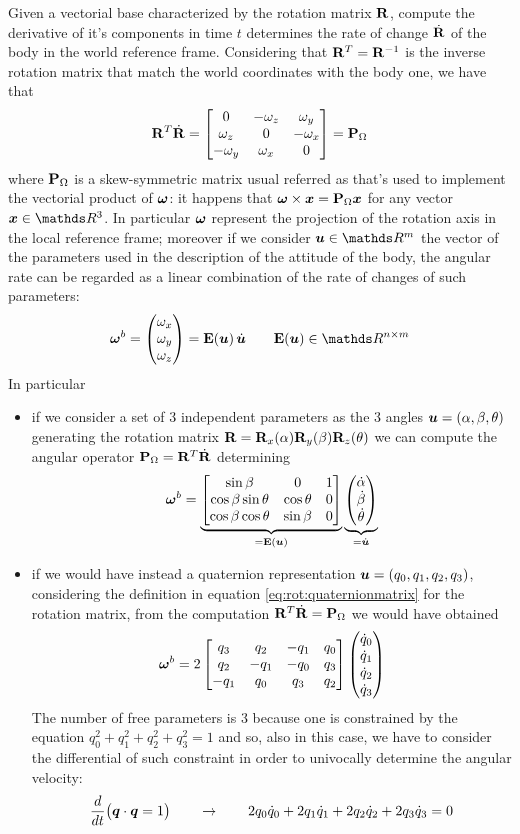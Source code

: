 		Given a vectorial base characterized by the rotation matrix $\mathbf{R}$, compute the derivative of it's components in time $t$ determines the rate of change $\dot {\mathbf{R}}$ of the body in the world reference frame. Considering that $\mathbf{R}^T = \mathbf{R}^{-1}$ is  the inverse rotation matrix that match the world coordinates with the body one, we have that
		\begin{equation}
			\mathbf{R}^T \dot {\mathbf{R}} = \begin{bmatrix} 0 & - \omega_z & \omega_y \\ \omega_z & 0 & - \omega_x \\ -\omega_y & \omega_x & 0 \end{bmatrix} = \mathbf{P}_\Omega
		\end{equation}
		where $\mathbf{P}_\Omega$ is a skew-symmetric matrix usual referred as  that's used to implement the vectorial product of $\boldsymbol{\omega}$: it happens that $\boldsymbol{\omega} \times \boldsymbol{x} = \mathbf{P}_\Omega \boldsymbol{x}$ for any vector $\vett x \in \mathds R^3$. In particular $\boldsymbol{\omega}$ represent the projection of the rotation axis in the local reference frame; moreover if we consider $\vett u \in \mathds R^m$ the vector of the parameters used in the description of the attitude of the body, the angular rate can be regarded as a linear combination of the rate of changes of such parameters:
		\[ \vett \omega^b = \vector{\omega_x \\ \omega_y \\ \omega_z} = \mat E(\vett u) \, \dvett u \qquad \mat E(\vett u) \in \mathds R^{n\times m}\]
		In particular
		\begin{itemize}
			\item if we consider a set of 3 independent parameters as the 3 angles $\boldsymbol{u} = (\alpha,\beta,\theta)$ generating the rotation matrix $\mathbf{R}= \mathbf{R}_x(\alpha) \mathbf{R}_y(\beta) \mathbf{R}_z(\theta)$ we can compute the angular operator $\mathbf{P}_\Omega = \mathbf{R}^T \dot{\mathbf{R}}$ determining 
			\[ \boldsymbol{\omega}^b = \underbrace{ \begin{bmatrix}  \sin \beta & 0 & 1 \\ \cos\beta\sin\theta & \cos\theta & 0 \\ \cos\beta \cos\theta & \sin\beta & 0  \end{bmatrix}}_{=\mathbf{E}(\boldsymbol{u})} \underbrace{\begin{pmatrix} \dot \alpha \\ \dot \beta \\ \dot \theta \end{pmatrix}}_{=\dot{\boldsymbol{u}}} \]
			\item if we would have instead a quaternion representation $\boldsymbol{u} = (q_0,q_1,q_2,q_3)$, considering the definition in equation \ref{eq:rot:quaternionmatrix} for the rotation matrix, from the computation $\mathbf{R}^T \dot {\mathbf{R}} = \mathbf{P}_\Omega$ we would have obtained
			\[ \boldsymbol{\omega}^b = 2 \begin{bmatrix}  q_3 & q_2 & - q_1 & q_0 \\ q_2 & - q_1 & - q_0 & q_3 \\ -q_1 & q_0 & q_3 & q_2  \end{bmatrix} \begin{pmatrix} \dot q_0 \\ \dot q_1 \\ \dot q_2 \\ \dot q_3 \end{pmatrix} \]
			The number of free parameters is 3 because one is constrained by the equation $q_0^2 + q_1^2 + q_2^2 + q_3^2 = 1$ and so, also in this case, we have to consider the differential of such constraint in order to univocally determine the angular velocity:
			\[ \frac{d}{dt} \big(\boldsymbol{q} \cdot \boldsymbol{q} = 1 \big) \qquad \rightarrow \qquad 2q_0 \dot q_0 + 2 q_1 \dot q_1 + 2q_2\dot q_2 + 2 q_3 \dot q_3 = 0 \]
		\end{itemize}
